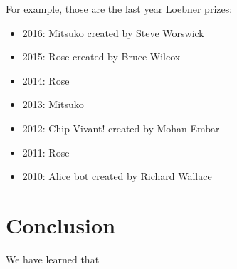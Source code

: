 \documentclass[12pt,twoside]{article}
\theoremstyle{plain}
\theoremstyle{definition}
\theoremstyle{remark}
\begin{document}
	For example, those are the last year Loebner prizes:
	
	\begin{itemize}
		\item 2016: Mitsuko created by Steve Worswick
		\item 2015: Rose created by Bruce Wilcox
		\item 2014: Rose 
		\item 2013: Mitsuko
		\item 2012: Chip Vivant! created by Mohan Embar
		\item 2011: Rose
		\item 2010: Alice bot created by Richard Wallace
	\end{itemize}





\section{Conclusion}
\label{sec:conclusion}

We have learned that

%
%
\nocite{*}

\newpage


\end{document}
